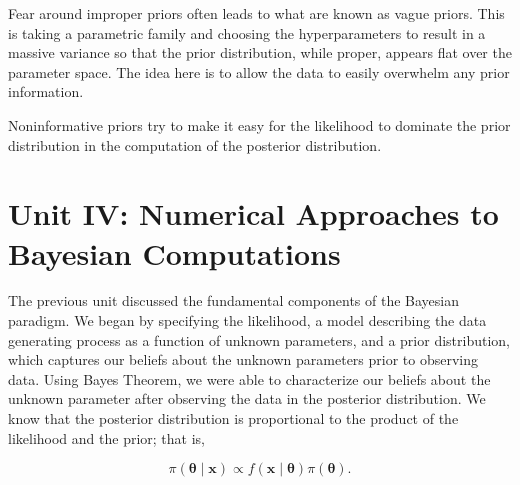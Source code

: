 \documentclass[
  letterpaper,
  DIV=11,
  numbers=noendperiod]{scrreprt}
\theoremstyle{definition}
\theoremstyle{definition}
\theoremstyle{plain}
\theoremstyle{remark}
\begin{document}
Fear around improper priors often leads to what are known as vague
priors. This is taking a parametric family and choosing the
hyperparameters to result in a massive variance so that the prior
distribution, while proper, appears flat over the parameter space. The
idea here is to allow the data to easily overwhelm any prior
information.

\begin{tcolorbox}[enhanced jigsaw, arc=.35mm, bottomtitle=1mm, colback=white, rightrule=.15mm, titlerule=0mm, opacityback=0, breakable, colbacktitle=quarto-callout-tip-color!10!white, toprule=.15mm, left=2mm, leftrule=.75mm, toptitle=1mm, title=\textcolor{quarto-callout-tip-color}{\faLightbulb}\hspace{0.5em}{Big Idea}, opacitybacktitle=0.6, bottomrule=.15mm, colframe=quarto-callout-tip-color-frame, coltitle=black]

Noninformative priors try to make it easy for the likelihood to dominate
the prior distribution in the computation of the posterior distribution.

\end{tcolorbox}

\part{Unit IV: Numerical Approaches to Bayesian Computations}

\providecommand{\norm}[1]{\lVert#1\rVert}
\providecommand{\abs}[1]{\lvert#1\rvert}
\providecommand{\iid}{\stackrel{\text{IID}}{\sim}}
\providecommand{\ind}{\stackrel{\text{Ind}}{\sim}}

\providecommand{\bm}[1]{\mathbf{#1}}
\providecommand{\bs}[1]{\boldsymbol{#1}}
\providecommand{\bbeta}{\bs{\beta}}

\providecommand{\Ell}{\mathcal{L}}
\providecommand{\indep}{\perp\negthickspace\negmedspace\perp}

The previous unit discussed the fundamental components of the Bayesian
paradigm. We began by specifying the likelihood, a model describing the
data generating process as a function of unknown parameters, and a prior
distribution, which captures our beliefs about the unknown parameters
prior to observing data. Using Bayes Theorem, we were able to
characterize our beliefs about the unknown parameter after observing the
data in the posterior distribution. We know that the posterior
distribution is proportional to the product of the likelihood and the
prior; that is,

\[\pi(\boldsymbol{\theta} \mid \mathbf{x}) \propto f(\mathbf{x} \mid \boldsymbol{\theta}) \pi(\boldsymbol{\theta}).\]
\end{document}
